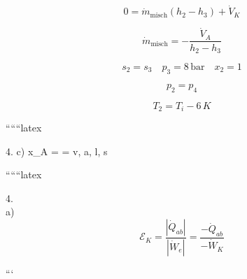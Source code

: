 \[
0 = \dot{m}_{\text{misch}} (h_2 - h_3) + \dot{V}_K
\]

\[
\dot{m}_{\text{misch}} = - \frac{\dot{V}_A}{h_2 - h_3}
\]

\[
s_2 = s_3 \quad p_3 = 8 \, \text{bar} \quad x_2 = 1
\]

\[
p_2 = p_4
\]

\[
T_2 = T_i - 6 \, K
\]

``````latex


4. c) \quad x_A = \frac{\phi - \phi_{\epsilon}}{\phi_{\beta} - \phi_{\epsilon}} \quad \phi = v, a, l, s

``````latex


4. \\
a) \\
\[
\mathcal{E}_K = \frac{|\dot{Q}_{ab}|}{|\dot{W}_e|} = \frac{-\dot{Q}_{ab}}{-\dot{W}_K}
\]

```